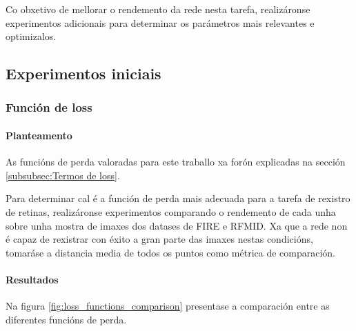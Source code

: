 Co obxetivo de mellorar o rendemento da rede nesta tarefa, realizáronse experimentos adicionais para determinar os parámetros mais relevantes e optimizalos.

\subsection{Experimentos iniciais}
\label{subsec:Experimentos iniciais}


\FloatBarrier

\subsubsection{Función de loss}
\label{subsubsec:Función de loss}

\paragraph{Planteamento}
\label{par:Planteamento-loss}

As funcións de perda valoradas para este traballo xa forón explicadas na sección \ref{subsubsec:Termos de loss}.

Para determinar cal é a función de perda mais adecuada para a tarefa de rexistro de retinas, realizáronse experimentos comparando o rendemento de cada unha sobre unha mostra de imaxes dos datases de FIRE e RFMID.
Xa que a rede non é capaz de rexistrar con éxito a gran parte das imaxes nestas condicións, tomaráse a distancia media de todos os puntos como métrica de comparación.

\paragraph{Resultados}
\label{par:Resultados-loss}

Na figura \ref{fig:loss_functions_comparison} presentase a comparación entre as diferentes funcións de perda.




